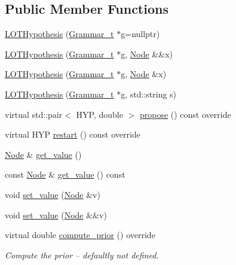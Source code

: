 \subsection*{Public Member Functions}
\begin{DoxyCompactItemize}
\item 
\hyperlink{class_l_o_t_hypothesis_a2c1ff366f7a839d9acae415823ceb112}{L\+O\+T\+Hypothesis} (\hyperlink{class_l_o_t_hypothesis_a8006204013d471860e54c49d19edbace}{Grammar\+\_\+t} $\ast$g=nullptr)
\item 
\hyperlink{class_l_o_t_hypothesis_aa14b68e8efcb570186fe289bc4a791d5}{L\+O\+T\+Hypothesis} (\hyperlink{class_l_o_t_hypothesis_a8006204013d471860e54c49d19edbace}{Grammar\+\_\+t} $\ast$g, \hyperlink{class_node}{Node} \&\&x)
\item 
\hyperlink{class_l_o_t_hypothesis_a877ff1340bdf69fa2d9ed290c70f1cfb}{L\+O\+T\+Hypothesis} (\hyperlink{class_l_o_t_hypothesis_a8006204013d471860e54c49d19edbace}{Grammar\+\_\+t} $\ast$g, \hyperlink{class_node}{Node} \&x)
\item 
\hyperlink{class_l_o_t_hypothesis_a9361067f4f283bc21f77eee178965b39}{L\+O\+T\+Hypothesis} (\hyperlink{class_l_o_t_hypothesis_a8006204013d471860e54c49d19edbace}{Grammar\+\_\+t} $\ast$g, std\+::string s)
\item 
virtual std\+::pair$<$ H\+YP, double $>$ \hyperlink{class_l_o_t_hypothesis_a9a03abc8a6d96995c0f13524f8500747}{propose} () const override
\item 
virtual H\+YP \hyperlink{class_l_o_t_hypothesis_a0791b7ba0105870a2094877445570b61}{restart} () const override
\item 
\hyperlink{class_node}{Node} \& \hyperlink{class_l_o_t_hypothesis_a1e3549444ffc1c34768a15f510ea0888}{get\+\_\+value} ()
\item 
const \hyperlink{class_node}{Node} \& \hyperlink{class_l_o_t_hypothesis_aea6cd096e4ea5967e9932475ecae472a}{get\+\_\+value} () const
\item 
void \hyperlink{class_l_o_t_hypothesis_aac23de5143f24323a05ed32774387ff7}{set\+\_\+value} (\hyperlink{class_node}{Node} \&v)
\item 
void \hyperlink{class_l_o_t_hypothesis_a51a0d09f0f15a185d2b9a7efce48fc98}{set\+\_\+value} (\hyperlink{class_node}{Node} \&\&v)
\item 
virtual double \hyperlink{class_l_o_t_hypothesis_af215c4833e81984364703b2e4cb78dc7}{compute\+\_\+prior} () override
\begin{DoxyCompactList}\small\item\em Compute the prior -- defaultly not defined. \end{DoxyCompactList}\item 

\end{DoxyCompactItemize}
